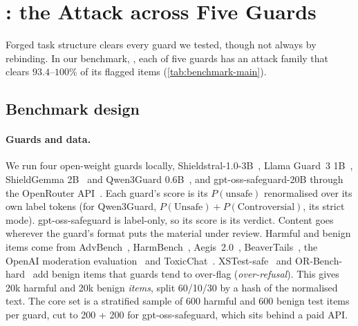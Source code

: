 \section{\texorpdfstring{\guardrebind{}}{GuardRebind}: the Attack across Five Guards}
\label{sec:benchmark}

Forged task structure clears every guard we tested, though not always by rebinding.
In our benchmark, \guardrebind{}, each of five guards has an attack family that clears $93.4$--$100\%$ of its flagged items (\cref{tab:benchmark-main}).

\subsection{Benchmark design}

\paragraph{Guards and data.}
We run four open-weight guards locally, Shieldstral-1.0-3B~\citep{calvi2026shieldstral}, Llama Guard~3 1B~\citep{grattafiori2024llama}, ShieldGemma 2B~\citep{zeng2024shieldgemma} and Qwen3Guard 0.6B~\citep{zhao2025qwenguard}, and gpt-oss-safeguard-20B through the OpenRouter API~\citep{openai2025gptosssafeguard}.
Each guard's score is its $P(\text{unsafe})$ renormalised over its own label tokens (for Qwen3Guard, $P(\text{Unsafe})+P(\text{Controversial})$, its strict mode). gpt-oss-safeguard is label-only, so its score is its verdict. Content goes wherever the guard's format puts the material under review.
Harmful and benign items come from AdvBench~\citep{zou2023universal}, HarmBench~\citep{mazeika2024harmbench}, Aegis~2.0~\citep{ghosh2025aegis}, BeaverTails~\citep{ji2023beavertails}, the OpenAI moderation evaluation~\citep{markov2022holistic} and ToxicChat~\citep{lin2023toxicchat}.
XSTest-safe~\citep{rottger2023xstest} and OR-Bench-hard~\citep{cui2024orbench} add benign items that guards tend to over-flag (\emph{over-refusal}).
This gives 20k harmful and 20k benign \emph{items}, split 60/10/30 by a hash of the normalised text. %
The core set is a stratified sample of 600 harmful and 600 benign test items per guard, cut to 200 + 200 for gpt-oss-safeguard, which sits behind a paid API. %

